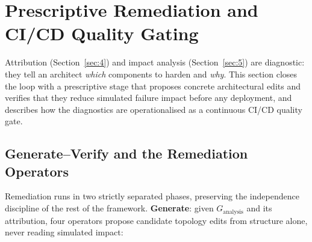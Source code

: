 \hypertarget{prescriptive-remediation-and-cicd-quality-gating}{%
\section{Prescriptive Remediation and CI/CD Quality Gating}\label{prescriptive-remediation-and-cicd-quality-gating}}

\label{sec:6}

Attribution (Section~\ref{sec:4}) and impact analysis (Section~\ref{sec:5}) are diagnostic: they tell
an architect \emph{which} components to harden and \emph{why}. This section closes the loop with a
prescriptive stage that proposes concrete architectural edits and verifies that they reduce simulated
failure impact before any deployment, and describes how the diagnostics are operationalised as a
continuous CI/CD quality gate.

\hypertarget{generateverify-and-the-remediation-operators}{%
\subsection{Generate--Verify and the Remediation Operators}\label{generateverify-and-the-remediation-operators}}

\label{sec:6.1}

Remediation runs in two strictly separated phases, preserving the independence discipline of the rest
of the framework. \textbf{Generate}: given \(G_{\text{analysis}}\) and its attribution, four
operators propose candidate topology edits from structure alone, never reading simulated impact:

